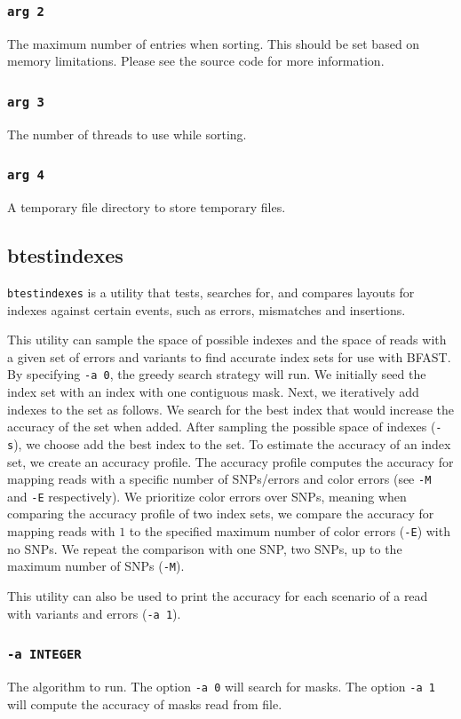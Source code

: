 \documentclass[a4paper,12pt]{book}
\newcommand{\TT}[1]{{\tt #1}} %
\begin{document}
\subsubsection{\TT{arg 2}}
The maximum number of entries when sorting.
This should be set based on memory limitations.
Please see the source code for more information.
\subsubsection{\TT{arg 3}}
The number of threads to use while sorting.
\subsubsection{\TT{arg 4}}
A temporary file directory to store temporary files.
\subsection{btestindexes}
\label{sec:btestindexes}
\TT{btestindexes} is a utility that tests, searches for, and compares layouts for indexes against certain events, such as errors, mismatches and insertions.

This utility can sample the space of possible indexes and the space of reads with a given set of errors and variants to find accurate index sets for use with BFAST.
By specifying \TT{-a 0}, the greedy search strategy will run.
We initially seed the index set with an index with one contiguous mask.
Next, we iteratively add indexes to the set as follows.
We search for the best index that would increase the accuracy of the set when added.
After sampling the possible space of indexes (\TT{-s}), we choose add the best index to the set.
To estimate the accuracy of an index set, we create an accuracy profile.
The accuracy profile computes the accuracy for mapping reads with a specific number of SNPs/errors and color errors (see \TT{-M} and \TT{-E} respectively).
We prioritize color errors over SNPs, meaning when comparing the accuracy profile of two index sets, we compare the accuracy for mapping reads with $1$ to the specified maximum number of color errors (\TT{-E}) with no SNPs.
We repeat the comparison with one SNP, two SNPs, up to the maximum number of SNPs (\TT{-M}).

This utility can also be used to print the accuracy for each scenario of a read with variants and errors (\TT{-a 1}). 

\subsubsection{\TT{-a INTEGER}}
The algorithm to run.
The option \TT{-a 0} will search for masks.
The option \TT{-a 1} will compute the accuracy of masks read from file.
\end{document}

